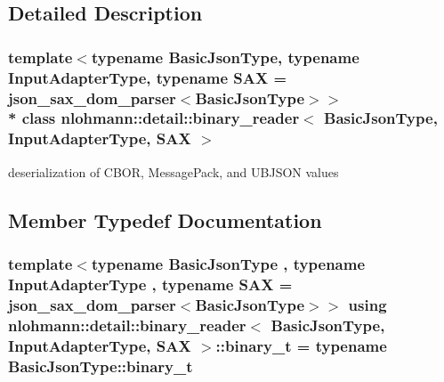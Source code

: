 \subsection{Detailed Description}
\subsubsection*{template$<$typename Basic\+Json\+Type, typename Input\+Adapter\+Type, typename S\+AX = json\+\_\+sax\+\_\+dom\+\_\+parser$<$\+Basic\+Json\+Type$>$$>$\\*
class nlohmann\+::detail\+::binary\+\_\+reader$<$ Basic\+Json\+Type, Input\+Adapter\+Type, S\+A\+X $>$}

deserialization of C\+B\+OR, Message\+Pack, and U\+B\+J\+S\+ON values 

\subsection{Member Typedef Documentation}
\subsubsection[{\texorpdfstring{binary\+\_\+t}{binary_t}}]{\setlength{\rightskip}{0pt plus 5cm}template$<$typename Basic\+Json\+Type , typename Input\+Adapter\+Type , typename S\+AX  = json\+\_\+sax\+\_\+dom\+\_\+parser$<$\+Basic\+Json\+Type$>$$>$ using {\bf nlohmann\+::detail\+::binary\+\_\+reader}$<$ Basic\+Json\+Type, Input\+Adapter\+Type, S\+AX $>$\+::{\bf binary\+\_\+t} =  typename Basic\+Json\+Type\+::binary\+\_\+t\hspace{0.3cm}{\ttfamily [private]}}\hypertarget{classnlohmann_1_1detail_1_1binary__reader_acf127bb88e4147fb692edabc2a0f0663}{}\label{classnlohmann_1_1detail_1_1binary__reader_acf127bb88e4147fb692edabc2a0f0663}
